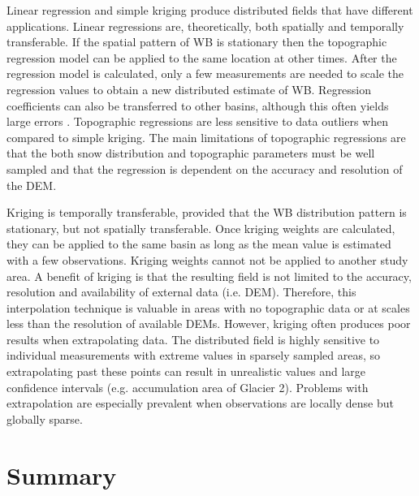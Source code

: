 \documentclass{sfuthesis}
\begin{document}
Linear regression and simple kriging produce distributed fields that have different applications. Linear regressions are, theoretically, both spatially and temporally transferable. If the spatial pattern of WB is stationary then the topographic regression model can be applied to the same location at other times. After the regression model is calculated, only a few measurements are needed to scale the regression values to obtain a new distributed estimate of WB. Regression coefficients can also be transferred to other basins, although this often yields large errors \citep{Grunewald2010}. Topographic regressions are less sensitive to data outliers when compared to simple kriging. The main limitations of topographic regressions are that the both snow distribution and topographic parameters must be well sampled and that the regression is dependent on the accuracy and resolution of the DEM. 

Kriging is temporally transferable, provided that the WB distribution pattern is stationary, but not spatially transferable. Once kriging weights are calculated, they can be applied to the same basin as long as the mean value is estimated with a few observations. Kriging weights cannot not be applied to another study area. A benefit of kriging is that the resulting field is not limited to the accuracy, resolution and availability of external data (i.e. DEM). Therefore, this interpolation technique is valuable in areas with no topographic data or at scales less than the resolution of available DEMs. However, kriging often produces poor results when extrapolating data. The distributed field is highly sensitive to individual measurements with extreme values in sparsely sampled areas, so extrapolating past these points can result in unrealistic values and large confidence intervals (e.g. accumulation area of Glacier 2). Problems with extrapolation are especially prevalent when observations are locally dense but globally sparse.



\section{Summary}
\end{document}
